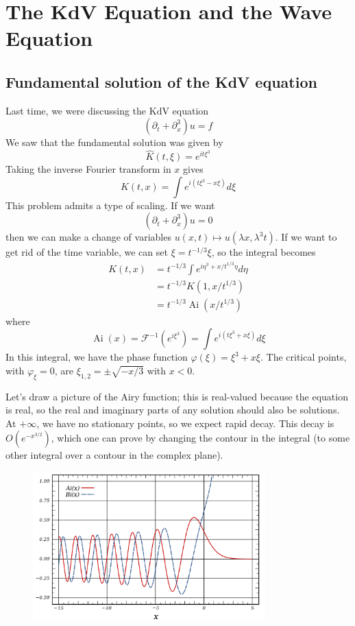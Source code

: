 \newpage
\section{The KdV Equation and the Wave Equation}

\subsection{Fundamental solution of the KdV equation}
Last time, we were discussing the $\mathrm{KdV}$ equation
$$
\left(\partial_{t}+\partial_{x}^{3}\right) u=f
$$
We saw that the fundamental solution was given by
$$
\widehat{K}(t, \xi)=e^{i t \xi^{3}}
$$
Taking the inverse Fourier transform in $x$ gives
$$
K(t, x)=\int e^{i\left(t \xi^{3}-x \xi\right)} d \xi
$$
This problem admits a type of scaling. If we want
$$
\left(\partial_{t}+\partial_{x}^{3}\right) u=0
$$
then we can make a change of variables $u(x, t) \mapsto u\left(\lambda x, \lambda^{3} t\right)$. If we want to get rid of the time variable, we can set $\xi=t^{-1 / 3} \xi$, so the integral becomes
$$
\begin{aligned}
K(t, x) &=t^{-1 / 3} \int e^{i \eta^{3}+x / t^{1 / 3} \eta} d \eta \\
&=t^{-1 / 3} K\left(1, x / t^{1 / 3}\right) \\
&=t^{-1 / 3} \operatorname{Ai}\left(x / t^{1 / 3}\right)
\end{aligned}
$$
where
$$
\operatorname{Ai}(x)=\mathcal{F}^{-1}\left(e^{i \xi^{3}}\right)=\int e^{i\left(t\xi^{3}+x \xi\right)} d \xi
$$
In this integral, we have the phase function $\varphi(\xi)=\xi^{3}+x \xi$. The critical points, with $\varphi_{\xi}=0$, are $\xi_{1,2}= \pm \sqrt{-x / 3}$ with $x<0$.

Let's draw a picture of the Airy function; this is real-valued because the equation is real, so the real and imaginary parts of any solution should also be solutions. At $+\infty$, we have no stationary points, so we expect rapid decay. This decay is $O\left(e^{-x^{3 / 2}}\right)$, which one can prove by changing the contour in the integral (to some other integral over a contour in the complex plane).

\begin{figure}[H]
    \centering
    \includegraphics[width=0.8\textwidth]{pics/19-1.png}
\end{figure}

